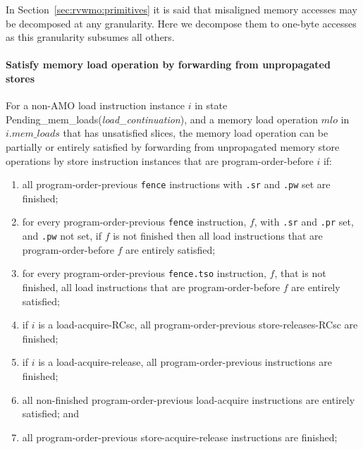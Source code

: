 \begin{commentary}
In Section~\ref{sec:rvwmo:primitives} it is said that misaligned memory accesses may be decomposed at any granularity.
Here we decompose them to one-byte accesses as this granularity subsumes all others.
\end{commentary}

\paragraph{Satisfy memory load operation by forwarding from unpropagated stores}\label{omm:sat_by_forwarding}
For a non-AMO load instruction instance $i$ in state {\sc Pending\_mem\_loads}({\it load\_continuation}), and a memory load operation $mlo$ in $i.\textit{mem\_loads}$ that has unsatisfied slices, the memory load operation can be partially or entirely satisfied by forwarding from unpropagated memory store operations by store instruction instances that are program-order-before $i$ if:
\begin{enumerate}
\item all program-order-previous {\tt fence} instructions with {\tt .sr} and {\tt .pw} set are finished;
\item for every program-order-previous {\tt fence} instruction, $f$, with {\tt .sr} and {\tt .pr} set, and {\tt .pw} not set, if $f$ is not finished then all load instructions that are program-order-before $f$ are entirely satisfied;
\item for every program-order-previous {\tt fence.tso} instruction, $f$, that is not finished, all load instructions that are program-order-before $f$ are entirely satisfied;
\item if $i$ is a load-acquire-RCsc, all program-order-previous store-releases-RCsc are finished;
\item if $i$ is a load-acquire-release, all program-order-previous instructions are finished;
\item all non-finished program-order-previous load-acquire instructions are entirely satisfied; and
\item all program-order-previous store-acquire-release instructions are finished;
\end{enumerate}

